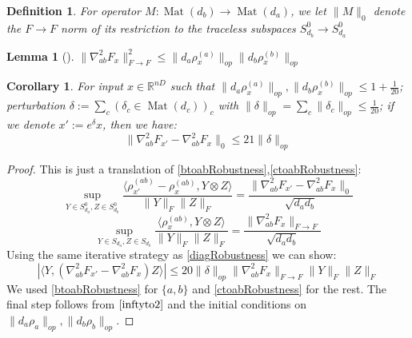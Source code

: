 \documentclass{article}
\newtheorem{corollary}[theorem]{Corollary}
\newtheorem{lemma}[theorem]{Lemma}
\newtheorem{definition}{Definition}
\newcommand{\R}{{\mathbb{R}}}
\newcommand{\mat}{\operatorname{Mat}}
\newcommand\smallSym{S}
\newcommand\samp{x}
\newcommand{\AR}[1]{{\color{orange}[AR: #1]}}
\begin{document}
\begin{definition}
For operator $M : \mat(d_{b}) \to \mat(d_{a})$, we let $\|M\|_{0}$ denote the $F \to F$ norm of its restriction to the traceless subspaces $\smallSym^0_{d_b} \to \smallSym^0_{d_a}$
\end{definition}

\begin{lemma}[\cite{KLR19}] \label{inftyto2}
$\|\nabla^{2}_{ab} F_{\samp}\|_{F \to F}^{2} \leq \|d_{a} \rho_{\samp}^{(a)}\|_{op} \|d_{b} \rho_{\samp}^{(b)}\|_{op}$
\end{lemma}

\begin{corollary} \label{offdiagRobustness}
For input $\samp \in \R^{nD}$ such that $\|d_{a} \rho_{\samp}^{(a)}\|_{op}, \|d_{b} \rho_{\samp}^{(b)}\|_{op} \leq 1+\frac{1}{20}$; perturbation $\delta := \sum_{c} (\delta_{c} \in \mat(d_{c}))_{c}$ with $\|\delta\|_{op} = \sum_{c} \|\delta_{c}\|_{op} \leq \frac{1}{20}$; if we denote $\samp' := e^{\delta} \samp$, then we have:
\[ \|\nabla^{2}_{ab} F_{\samp'} - \nabla^{2}_{ab} F_{\samp}\|_{0} \leq 21 \|\delta\|_{op}  \]
\end{corollary}
\begin{proof}
This is just a translation of \cref{btoabRobustness},\cref{ctoabRobustness}:
\[ \sup_{Y \in \smallSym_{d_{a}}^{0}, Z \in \smallSym_{d_{b}}^{0}} \frac{\langle \rho_{\samp'}^{(ab)} - \rho_{\samp}^{(ab)}, Y \otimes Z \rangle}{\|Y\|_{F} \|Z\|_{F}} = \frac{\|\nabla^{2}_{ab} F_{\samp'} - \nabla^{2}_{ab} F_{\samp}\|_{0}}{\sqrt{d_{a} d_{b}} } \]
\[ \sup_{Y \in \smallSym_{d_{a}}, Z \in \smallSym_{d_{b}}} \frac{\langle \rho_{\samp}^{(ab)}, Y \otimes Z \rangle}{\|Y\|_{F} \|Z\|_{F}} = \frac{\|\nabla^{2}_{ab} F_{\samp}\|_{F \to F}}{\sqrt{d_{a} d_{b}} }       \]
Using the same iterative strategy as \cref{diagRobustness} we can show: 
\[ |\langle Y, (\nabla^{2}_{ab} F_{\samp'} - \nabla^{2}_{ab} F_{\samp}) Z \rangle| \leq 20 \|\delta\|_{op} \|\nabla^{2}_{ab} F_{\samp}\|_{F \to F} \|Y\|_{F} \|Z\|_{F}    \]
We used \cref{btoabRobustness} for $\{a,b\}$ and \cref{ctoabRobustness} for the rest. The final step follows from $\cref{inftyto2}$ and the initial conditions on $\|d_{a} \rho_{a}\|_{op}, \|d_{b} \rho_{b}\|_{op}$. 
\end{proof}
\end{document}
